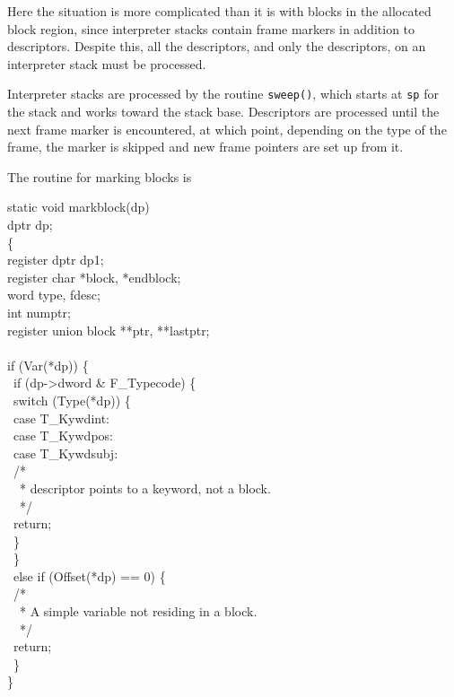 Here the situation is more complicated than it is with blocks in the
allocated block region, since interpreter stacks contain frame markers
in addition to descriptors. Despite this, all the descriptors, and
only the descriptors, on an interpreter stack must be processed.

Interpreter stacks are processed by the routine \texttt{sweep()},
which starts at \texttt{sp} for the stack and works toward the stack
base. Descriptors are processed until the next frame marker is
encountered, at which point, depending on the type of the frame, the
marker is skipped and new frame pointers are set up from it.

The routine for marking blocks is

\begin{iconcode}
static void markblock(dp)\\
dptr dp;\\
\>\{\\
\>register dptr dp1;\\
\>register char *block, *endblock;\\
\>word type, fdesc;\\
\>int numptr;\\
\>register union block **ptr, **lastptr;\\
\\
\>if (Var(*dp)) \{\\
\>\>\ if (dp->dword \& F\_Typecode) \{\\
\>\>\>\ switch (Type(*dp)) \{\\
\>\>\>\>\ case T\_Kywdint:\\
\>\>\>\>\ case T\_Kywdpos:\\
\>\>\>\>\ case T\_Kywdsubj:\\
\>\>\>\>\>\ /*\\
\>\>\>\>\>\ \ * descriptor points to a keyword, not a block.\\
\>\>\>\>\>\ \ */\\
\>\>\>\>\>\ return;\\
\>\>\>\>\ \}\\
\>\>\>\ \}\\
\>\>\ else if (Offset(*dp) == 0) \{\\
\>\>\>\ /*\\
\>\>\>\ \ * A simple variable not residing in a block.\\
\>\>\>\ \ */\\
\>\>\>\ return;\\
\>\>\>\ \}\\
\>\>\}\\

\end{iconcode}
